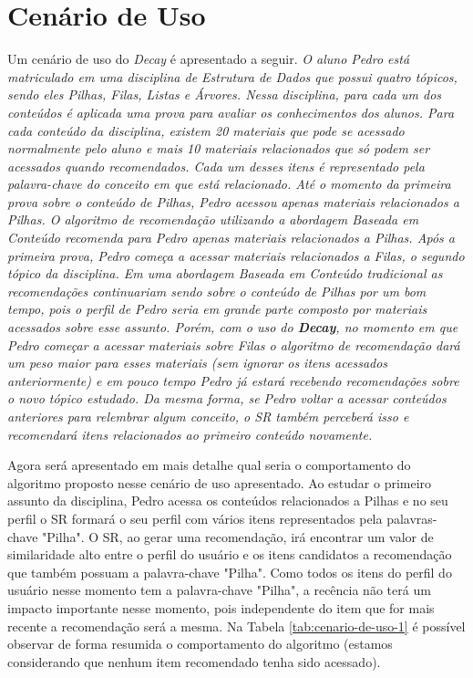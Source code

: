 \section{Cenário de Uso}

Um cenário de uso do \textit{Decay} é apresentado a seguir. \textit{O aluno Pedro está matriculado em uma disciplina de Estrutura de Dados
que possui quatro tópicos, sendo eles Pilhas, Filas, Listas e Árvores. Nessa disciplina, para cada um dos conteúdos é
aplicada uma prova para avaliar os conhecimentos dos alunos. Para cada conteúdo da disciplina, existem 20 materiais que pode
se acessado normalmente pelo aluno e mais 10 materiais relacionados que só podem ser acessados quando recomendados.
Cada um desses itens é representado pela palavra-chave do conceito em que está relacionado. Até o momento da primeira prova sobre o conteúdo de Pilhas,
Pedro acessou apenas materiais relacionados a Pilhas. O algoritmo de recomendação utilizando a abordagem Baseada em
Conteúdo recomenda para Pedro apenas materiais relacionados a Pilhas. Após a primeira prova, Pedro começa a acessar
materiais relacionados a Filas, o segundo tópico da disciplina. Em uma abordagem Baseada em Conteúdo tradicional as
recomendações continuariam sendo sobre o conteúdo de Pilhas por um bom tempo, pois o perfil de Pedro seria em grande
parte composto por materiais acessados sobre esse assunto. Porém, com o uso do \textbf{Decay}, no momento em que Pedro começar a
acessar materiais sobre Filas o algoritmo de recomendação dará um peso maior para esses materiais (sem ignorar os itens
acessados anteriormente) e em pouco tempo Pedro já estará recebendo recomendações sobre o novo tópico estudado. Da mesma
forma, se Pedro voltar a acessar conteúdos anteriores para relembrar algum conceito, o SR também perceberá isso e
recomendará itens relacionados ao primeiro conteúdo novamente.}

Agora será apresentado em mais detalhe qual seria o comportamento do algoritmo proposto nesse cenário de uso apresentado.
Ao estudar o primeiro assunto da disciplina, Pedro acessa os conteúdos relacionados a Pilhas e no seu perfil
o SR formará o seu perfil com vários itens representados pela palavras-chave "Pilha". O SR, ao gerar uma recomendação,
irá encontrar um valor de similaridade alto entre o perfil do usuário e os itens candidatos a recomendação que também possuam
a palavra-chave "Pilha". Como todos os itens do perfil do usuário nesse momento tem a palavra-chave "Pilha", a recência não
terá um impacto importante nesse momento, pois independente do item que for mais recente a recomendação será a mesma. Na
Tabela \ref{tab:cenario-de-uso-1} é possível observar de forma resumida o comportamento do algoritmo (estamos considerando
que nenhum item recomendado tenha sido acessado).

